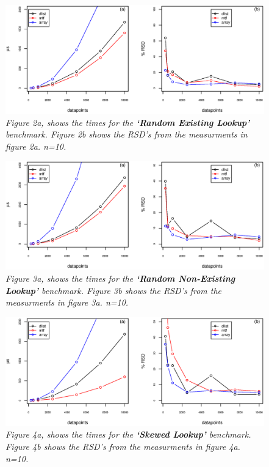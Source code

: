 \documentclass[a4paper,11pt,twoside]{article}
\begin{document}
\begin{figure}[H] 
\centering 
\includegraphics[width=\textwidth]{figures/fig2.eps}
\caption{\textit{Figure 2a, shows the times for the \textbf{`Random Existing
    Lookup'} benchmark. Figure 2b shows the RSD's from the measurments
in figure 2a. n=10.}}
\end{figure}

\begin{figure}[H] 
\centering 
\includegraphics[width=\textwidth]{figures/fig3.eps}
\caption{\textit{Figure 3a, shows the times for the \textbf{`Random
      Non-Existing Lookup'} benchmark. Figure 3b shows the RSD's from
    the measurments in figure 3a. n=10.}}
\end{figure}

\begin{figure}[H] 
\centering 
\includegraphics[width=\textwidth]{figures/fig4.eps}
\caption{\textit{Figure 4a, shows the times for the \textbf{`Skewed
      Lookup'} benchmark. Figure 4b shows the RSD's from the
    measurments in figure 4a. n=10.}}
\end{figure}
\end{document}
